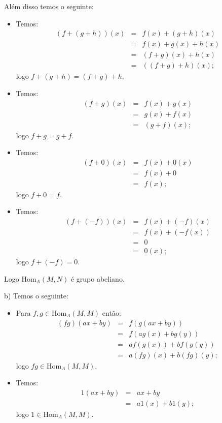 \documentclass[10pt,a4paper]{article}
\begin{document}
\noindent
Além disso temos o seguinte:
\begin{itemize}
\item Temos:
\[
\begin{array}{rcl}
(f+(g+h))(x)&=&f(x)+(g+h)(x)\\&=&f(x)+g(x)+h(x)\\&=&(f+g)(x)+h(x)\\&=&((f+g)+h)(x);
\end{array}
\]
logo $f+(g+h)=(f+g)+h$.
\item Temos:
\[
\begin{array}{rcl}
(f+g)(x)&=&f(x)+g(x)\\&=&g(x)+f(x)\\&=&(g+f)(x);
\end{array}
\]
logo $f+g=g+f$.
\item Temos:
\[
\begin{array}{rcl}
(f+0)(x)&=&f(x)+0(x)\\&=&f(x)+0\\&=&f(x);
\end{array}
\]
logo $f+0=f$.
\item Temos:
\[
\begin{array}{rcl}
(f+(-f))(x)&=&f(x)+(-f)(x)\\&=&f(x)+(-f(x))\\&=&0\\&=&0(x);
\end{array}
\]
logo $f+(-f)=0$.
\end{itemize}

\noindent
Logo $\mathrm{Hom}_A(M,N)$ é grupo abeliano.

\medskip
\noindent
b) Temos o seguinte:
\begin{itemize}
\item Para $f,g\in\mathrm{Hom}_A(M,M)$ então:
\[
\begin{array}{rcl}
(fg)(ax+by)&=&f(g(ax+by))\\&=&f(ag(x)+bg(y))\\&=&af(g(x))+bf(g(y))\\&=&a(fg)(x)+b(fg)(y);
\end{array}
\]
logo $fg\in\mathrm{Hom}_A(M,M)$.
\item Temos:
\[
\begin{array}{rcl}
1(ax+by)&=&ax+by\\&=&a1(x)+b1(y);
\end{array}
\]
logo $1\in\mathrm{Hom}_A(M,M)$.
\end{itemize}
\end{document}
